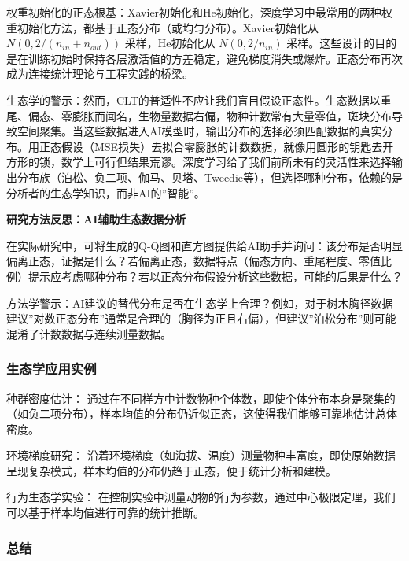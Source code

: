 \documentclass[
  twoside,12pt,fontset=none]{ctexbook}
\renewenvironment{quote}{%
  \def\FrameCommand{{\color{quote-border}\vrule width 4pt}\hspace{10pt}}%
  \MakeFramed {\advance\hsize-\width \FrameRestore\noindent\ignorespaces}%
}{%
  \endMakeFramed
}
\begin{document}
权重初始化的正态根基：Xavier初始化和He初始化，深度学习中最常用的两种权重初始化方法，都基于正态分布（或均匀分布）。Xavier初始化从 \(N(0, 2/(n_{in}+n_{out}))\) 采样，He初始化从 \(N(0, 2/n_{in})\) 采样。这些设计的目的是在训练初始时保持各层激活值的方差稳定，避免梯度消失或爆炸。正态分布再次成为连接统计理论与工程实践的桥梁。

生态学的警示：然而，CLT的普适性不应让我们盲目假设正态性。生态数据以重尾、偏态、零膨胀而闻名，生物量数据右偏，物种计数常有大量零值，斑块分布导致空间聚集。当这些数据进入AI模型时，输出分布的选择必须匹配数据的真实分布。用正态假设（MSE损失）去拟合零膨胀的计数数据，就像用圆形的钥匙去开方形的锁，数学上可行但结果荒谬。深度学习给了我们前所未有的灵活性来选择输出分布族（泊松、负二项、伽马、贝塔、Tweedie等），但选择哪种分布，依赖的是分析者的生态学知识，而非AI的''智能''。

\begin{quote}
\textbf{研究方法反思：AI辅助生态数据分析}

在实际研究中，可将生成的Q-Q图和直方图提供给AI助手并询问：该分布是否明显偏离正态，证据是什么？若偏离正态，数据特点（偏态方向、重尾程度、零值比例）提示应考虑哪种分布？若以正态分布假设分析这些数据，可能的后果是什么？

方法学警示：AI建议的替代分布是否在生态学上合理？例如，对于树木胸径数据建议''对数正态分布''通常是合理的（胸径为正且右偏），但建议''泊松分布''则可能混淆了计数数据与连续测量数据。
\end{quote}

\hypertarget{ux751fux6001ux5b66ux5e94ux7528ux5b9eux4f8b}{%
\subsubsection{生态学应用实例}\label{ux751fux6001ux5b66ux5e94ux7528ux5b9eux4f8b}}

种群密度估计：
通过在不同样方中计数物种个体数，即使个体分布本身是聚集的（如负二项分布），样本均值的分布仍近似正态，这使得我们能够可靠地估计总体密度。

环境梯度研究：
沿着环境梯度（如海拔、温度）测量物种丰富度，即使原始数据呈现复杂模式，样本均值的分布仍趋于正态，便于统计分析和建模。

行为生态学实验：
在控制实验中测量动物的行为参数，通过中心极限定理，我们可以基于样本均值进行可靠的统计推断。

\hypertarget{ux603bux7ed3-1}{%
\subsubsection{总结}\label{ux603bux7ed3-1}}
\end{document}
